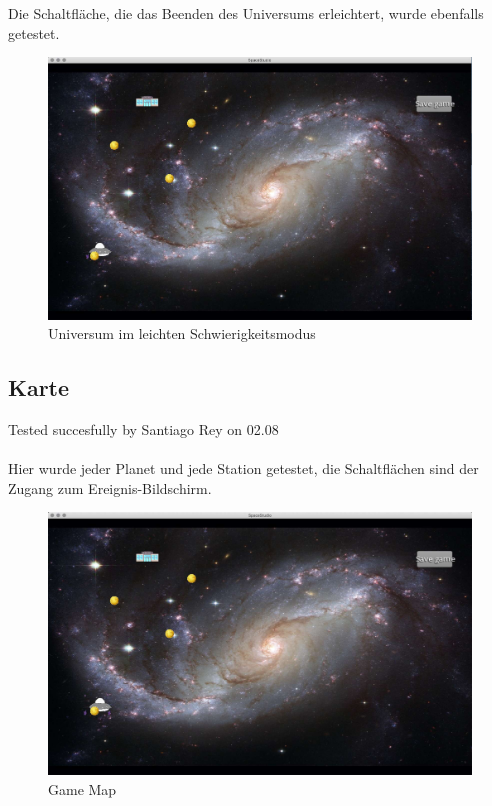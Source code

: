 \documentclass[12pt]{article}
\begin{document}
Die Schaltfläche, die das Beenden des Universums erleichtert, wurde ebenfalls getestet.\\

\begin{figure}[t]
\centering
\includegraphics[scale=0.4]{TestProtocolBilder/universeEase.jpg}
\caption{Universum im leichten Schwierigkeitsmodus}
\end{figure}

\newpage
\subsection{Karte}
Tested succesfully by Santiago Rey on 02.08\\\\
Hier wurde jeder Planet und jede Station getestet, die Schaltflächen sind der Zugang zum Ereignis-Bildschirm.\\
\begin{figure}
\centering
\includegraphics[scale=0.4]{TestProtocolBilder/map.jpg}
\caption{Game Map}
\end{figure}
\newpage
\end{document}

